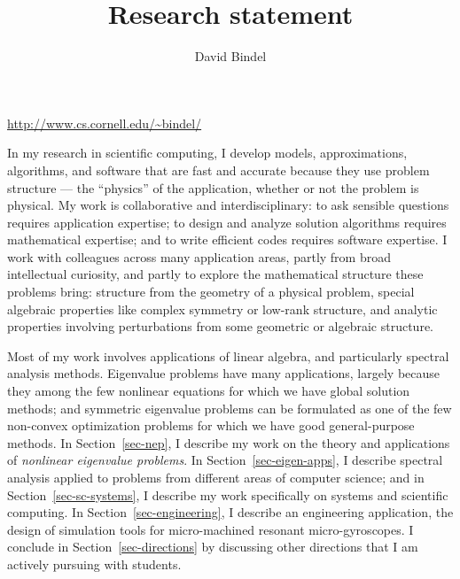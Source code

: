 \documentclass{amsart}
\title{Research statement}
\author{David Bindel}
\begin{document}
\maketitle
\vspace{-5mm}
\begin{center}
\url{http://www.cs.cornell.edu/~bindel/}
\end{center}
\vspace{+5mm}


In my research in scientific computing,
I develop models, approximations, algorithms, and software that
are fast and accurate because they use problem structure --- the
``physics'' of the application, whether or not the problem is physical.
%
My work is collaborative and interdisciplinary: to ask sensible questions
requires application expertise; to design and analyze solution
algorithms requires mathematical expertise; and to write efficient
codes requires software expertise.
%
I work with colleagues across many application areas, partly from
broad intellectual curiosity, and partly to explore the mathematical
structure these problems bring:
%
structure from the geometry of a physical problem,
special algebraic properties like complex symmetry or
low-rank structure, and
analytic properties involving perturbations from some geometric or
algebraic structure.

Most of my work involves applications of linear algebra, and
particularly spectral analysis methods.
%
Eigenvalue problems have many applications, largely because they among
the few nonlinear equations for which we have global solution methods;
and symmetric eigenvalue problems can be formulated as one of the few
non-convex optimization problems for which we have good general-purpose
methods.
%
In Section~\ref{sec-nep}, I describe my work on the theory and
applications of {\em nonlinear eigenvalue problems}.
%
In Section~\ref{sec-eigen-apps}, I describe spectral analysis applied to
problems from different areas of computer science; and in
Section~\ref{sec-sc-systems}, I describe my work specifically on systems
and scientific computing. In Section~\ref{sec-engineering}, I describe
an engineering application, the design of simulation tools for
micro-machined resonant micro-gyroscopes. I conclude in
Section~\ref{sec-directions} by discussing other directions
that I am actively pursuing with students.
\end{document}
